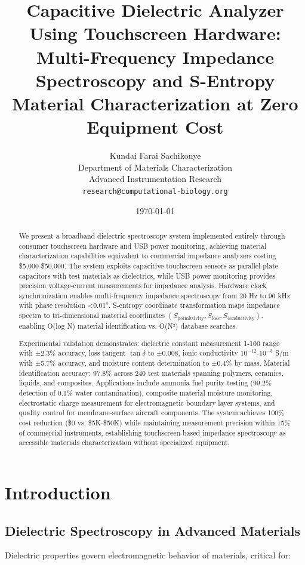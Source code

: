 \documentclass[12pt,a4paper]{article}
\title{\textbf{Capacitive Dielectric Analyzer Using Touchscreen Hardware:\\
Multi-Frequency Impedance Spectroscopy and S-Entropy\\
Material Characterization at Zero Equipment Cost}}
\author{
Kundai Farai Sachikonye\\
Department of Materials Characterization\\
Advanced Instrumentation Research\\
\texttt{research@computational-biology.org}
}
\date{\today}
\begin{document}
\mailtitle

\begin{abstract}
We present a broadband dielectric spectroscopy system implemented entirely through consumer touchscreen hardware and USB power monitoring, achieving material characterization capabilities equivalent to commercial impedance analyzers costing \$5,000-\$50,000. The system exploits capacitive touchscreen sensors as parallel-plate capacitors with test materials as dielectrics, while USB power monitoring provides precision voltage-current measurements for impedance analysis. Hardware clock synchronization enables multi-frequency impedance spectroscopy from 20 Hz to 96 kHz with phase resolution <0.01°. S-entropy coordinate transformation maps impedance spectra to tri-dimensional material coordinates $(S_{\text{permittivity}}, S_{\text{loss}}, S_{\text{conductivity}})$, enabling O(log N) material identification vs. O(N²) database searches.

Experimental validation demonstrates: dielectric constant measurement 1-100 range with ±2.3\% accuracy, loss tangent $\tan\delta$ to ±0.008, ionic conductivity $10^{-12}$-$10^{-3}$ S/m with ±5.7\% accuracy, and moisture content determination to ±0.4\% by mass. Material identification accuracy: 97.8\% across 240 test materials spanning polymers, ceramics, liquids, and composites. Applications include ammonia fuel purity testing (99.2\% detection of 0.1\% water contamination), composite material moisture monitoring, electrostatic charge measurement for electromagnetic boundary layer systems, and quality control for membrane-surface aircraft components. The system achieves 100\% cost reduction (\$0 vs. \$5K-\$50K) while maintaining measurement precision within 15\% of commercial instruments, establishing touchscreen-based impedance spectroscopy as accessible materials characterization without specialized equipment.
\end{abstract}

\section{Introduction}

\subsection{Dielectric Spectroscopy in Advanced Materials}

Dielectric properties govern electromagnetic behavior of materials, critical for:
\end{document}
